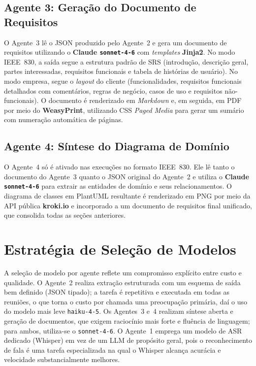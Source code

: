 \subsection{Agente 3: Geração do Documento de Requisitos}

O Agente~3 lê o JSON produzido pelo Agente~2 e gera um documento de requisitos utilizando o \textbf{Claude \texttt{sonnet-4-6}} com \textit{templates} \textbf{Jinja2}. No modo IEEE~830, a saída segue a estrutura padrão de SRS (introdução, descrição geral, partes interessadas, requisitos funcionais e tabela de histórias de usuário). No modo empresa, segue o \textit{layout} do cliente (funcionalidades, requisitos funcionais detalhados com comentários, regras de negócio, casos de uso e requisitos não-funcionais). O documento é renderizado em \textit{Markdown} e, em seguida, em PDF por meio do \textbf{WeasyPrint}, utilizando CSS \textit{Paged Media} para gerar um sumário com numeração automática de páginas.

\subsection{Agente 4: Síntese do Diagrama de Domínio}

O Agente~4 só é ativado nas execuções no formato IEEE~830. Ele lê tanto o documento do Agente~3 quanto o JSON original do Agente~2 e utiliza o \textbf{Claude \texttt{sonnet-4-6}} para extrair as entidades de domínio e seus relacionamentos. O diagrama de classes em PlantUML resultante é renderizado em PNG por meio da API pública \textbf{kroki.io} e incorporado a um documento de requisitos final unificado, que consolida todas as seções anteriores.

\section{Estratégia de Seleção de Modelos}

A seleção de modelo por agente reflete um compromisso explícito entre custo e qualidade. O Agente~2 realiza extração estruturada com um esquema de saída bem definido (JSON tipado); a tarefa é repetitiva e executada em todas as reuniões, o que torna o custo por chamada uma preocupação primária, daí o uso do modelo mais leve \texttt{haiku-4-5}. Os Agentes~3 e~4 realizam síntese aberta e geração de documentos, que exigem raciocínio mais forte e fluência de linguagem; para ambos, utiliza-se o \texttt{sonnet-4-6}. O Agente~1 emprega um modelo de ASR dedicado (Whisper) em vez de um LLM de propósito geral, pois o reconhecimento de fala é uma tarefa especializada na qual o Whisper alcança acurácia e velocidade substancialmente melhores.

